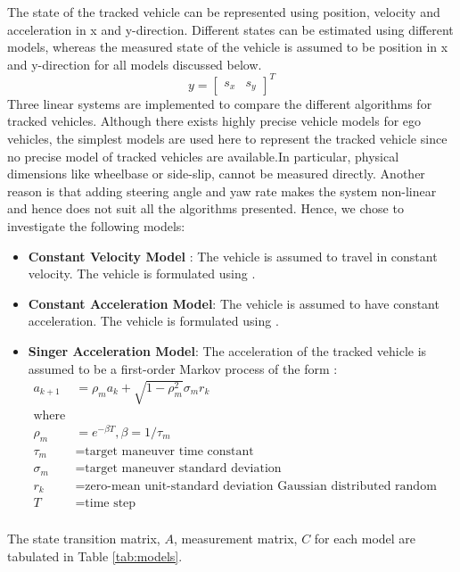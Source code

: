 The state of the tracked vehicle can be represented using position, velocity and acceleration in x and y-direction. Different states can be estimated using different models, whereas the measured state of the vehicle is assumed to be position in x and y-direction for all models discussed below.
\begin{equation*}
y =[ 
\begin{matrix}
s_x & s_y
\end{matrix}
]^T
\end{equation*}
Three linear systems are implemented to compare the different algorithms for tracked vehicles. Although there exists highly precise vehicle models for ego vehicles, the simplest models are used here to represent the tracked vehicle since no precise model of tracked vehicles are available.In particular, physical dimensions like wheelbase or side-slip, cannot be measured directly. Another reason is that adding steering angle and yaw rate makes the system non-linear and hence does not suit all the algorithms presented. Hence, we chose to investigate the following models:
\begin{itemize}
\item \textbf{Constant Velocity Model} : The vehicle is assumed to travel in constant velocity. The vehicle is formulated using \cite{Schubert2008}.
\item \textbf{Constant Acceleration Model}: The vehicle is assumed to have constant acceleration. The vehicle is formulated using \cite{Schubert2008}.
\item \textbf{Singer Acceleration Model}: The acceleration of the tracked vehicle is assumed to be a first-order Markov process of the form  \cite{Singer1970}:
\begin{equation}
\begin{split}
a_{k+1} & = \rho_m a_k + \sqrt{1- \rho_m^2} \sigma_m r_k\\
\text{where}\\
\rho_m &= e^{-\beta T}, \beta = 1/\tau_m\\
\tau_m &= \text{target maneuver time constant}\\
\sigma_m &= \text{target maneuver standard deviation}\\
r_k &= \text{zero-mean unit-standard deviation Gaussian distributed random variable}\\
T &= \text{time step}\\
\end{split}
\end{equation}
\end{itemize}
The state transition matrix, $A$, measurement matrix, $C$ for each model are tabulated in Table \ref{tab:models}.

